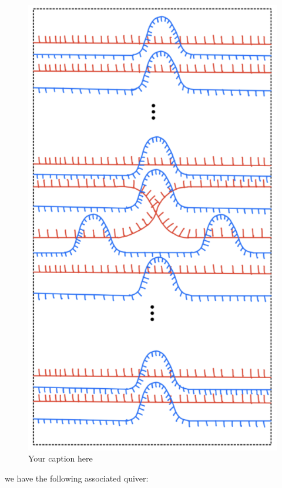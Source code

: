 \begin{figure}[H] 
    \centering
    \includegraphics[scale = 0.95]{diagrams/local_systems_on_as_diagrams/1.png} 
    \caption{Your caption here}
    \label{fig:your-label}
\end{figure}

we have the following associated quiver:

